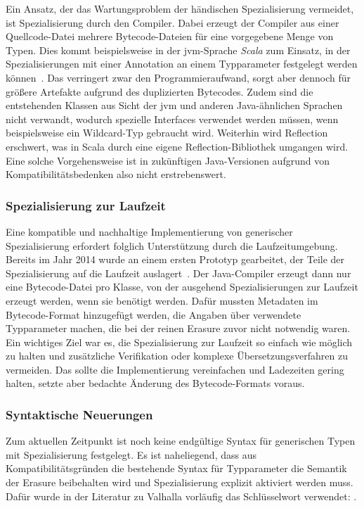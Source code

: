 Ein Ansatz, der das Wartungsproblem der händischen Spezialisierung vermeidet, ist Spezialisierung durch den Compiler.
Dabei erzeugt der Compiler aus einer Quellcode-Datei mehrere Bytecode-Dateien für eine vorgegebene Menge von Typen.
Dies kommt beispielsweise in der \ac{jvm}-Sprache \emph{Scala} zum Einsatz, in der Spezialisierungen mit einer Annotation an einem Typparameter festgelegt werden können~\cite{scala-specialized}.
Das verringert zwar den Programmieraufwand, sorgt aber dennoch für größere Artefakte aufgrund des duplizierten Bytecodes.
Zudem sind die entstehenden Klassen aus Sicht der \ac{jvm} und anderen Java-ähnlichen Sprachen nicht verwandt, wodurch spezielle Interfaces verwendet werden müssen, wenn beispielsweise ein Wildcard-Typ gebraucht wird.
Weiterhin wird Reflection erschwert, was in Scala durch eine eigene Reflection-Bibliothek umgangen wird.
Eine solche Vorgehensweise ist in zukünftigen Java-Versionen aufgrund von Kompatibilitätsbedenken also nicht erstrebenswert.

\subsubsection{Spezialisierung zur Laufzeit}

Eine kompatible und nachhaltige Implementierung von generischer Spezialisierung erfordert folglich Unterstützung durch die Laufzeitumgebung.
Bereits im Jahr 2014 wurde an einem ersten Prototyp gearbeitet, der Teile der Spezialisierung auf die Laufzeit auslagert~\cite{specialization}.
Der Java-Compiler erzeugt dann nur eine Bytecode-Datei pro Klasse, von der ausgehend Spezialisierungen zur Laufzeit erzeugt werden, wenn sie benötigt werden.
Dafür mussten Metadaten im Bytecode-Format hinzugefügt werden, die Angaben über verwendete Typparameter machen, die bei der reinen Erasure zuvor nicht notwendig waren.
Ein wichtiges Ziel war es, die Spezialisierung zur Laufzeit so einfach wie möglich zu halten und zusätzliche Verifikation oder komplexe Übersetzungsverfahren zu vermeiden.
Das sollte die Implementierung vereinfachen und Ladezeiten gering halten, setzte aber bedachte Änderung des Bytecode-Formats voraus.

\subsubsection{Syntaktische Neuerungen}

Zum aktuellen Zeitpunkt ist noch keine endgültige Syntax für generischen Typen mit Spezialisierung festgelegt.
Es ist naheliegend, dass aus Kompatibilitätsgründen die bestehende Syntax für Typparameter die Semantik der Erasure beibehalten wird und Spezialisierung explizit aktiviert werden muss.
Dafür wurde in der Literatur zu Valhalla vorläufig das Schlüsselwort  verwendet: .

